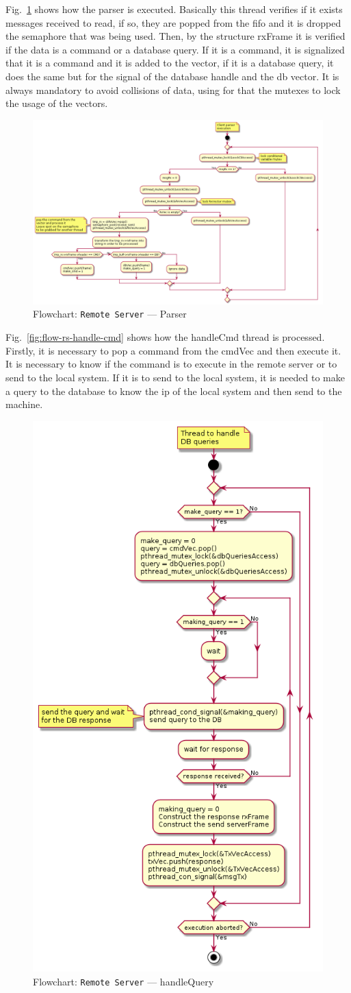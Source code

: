 Fig.~\ref{fig:flow-rs-parser} shows how the parser is executed.
Basically this thread verifies if it exists messages received to read, if so, they are popped from the \gls{fifo} and it is dropped the semaphore that was being used.
Then, by the structure rxFrame it is verified if the data is a command or a database query. If it is a command, it is signalized that it is a command and it is added to the vector, if it is a database query, it does the same but for the signal of the database handle and the db vector.
It is always mandatory to avoid collisions of data, using for that the mutexes to lock the usage of the vectors.
%
\begin{figure}[htb!]
\centering
    \includegraphics[width=0.8\columnwidth]{./img/flow-rs-parser.png}
  \caption{Flowchart: \texttt{Remote Server} --- Parser}%
\label{fig:flow-rs-parser}
\end{figure}

Fig.~\ref{fig:flow-rs-handle-cmd} shows how the handleCmd thread is processed.
Firstly, it is necessary to pop a command from the cmdVec and then execute it.
It is necessary to know if the command is to execute in the remote server or to send to the local system. If it is to send to the local system, it is needed to make a query to the database to know the ip of the local system and then send to the machine. 
%
\begin{figure}[htb!]
\centering
    \includegraphics[width=0.4\columnwidth]{./img/flow-rs-handle-query.png}
  \caption{Flowchart: \texttt{Remote Server} --- handleQuery}%
\label{fig:flow-rs-handle-query}
\end{figure}


